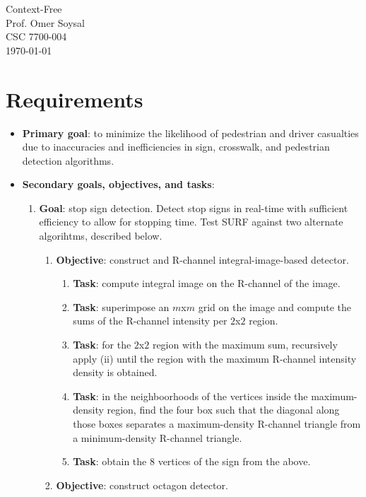 \documentclass{article}
\begin{document}
\begin{flushright}
   Context-Free
\\ Prof. Omer Soysal
\\ CSC 7700-004
\\ \today 
\end{flushright}

\section{Requirements}
\begin{itemize}
 \item \textbf{Primary goal}: to minimize the likelihood of pedestrian and driver casualties due to inaccuracies and inefficiencies in sign, crosswalk, and pedestrian detection algorithms.
 \item \textbf{Secondary goals, objectives, and tasks}: 
  \begin{enumerate} 
    \item \textbf{Goal}: stop sign detection. Detect stop signs in real-time with sufficient efficiency to allow for stopping time. Test SURF against two alternate algorihtms, described below.
    \begin{enumerate} 
     \item \textbf{Objective}: construct and R-channel integral-image-based detector.
      \begin{enumerate}
       \item \textbf{Task}: compute integral image on the R-channel of the image. 
       \item \textbf{Task}: superimpose an $m$x$m$ grid on the image and compute the
                   sums of the R-channel intensity per $2$x$2$ region.
       \item \textbf{Task}: for the $2$x$2$ region with the maximum sum, recursively
                   apply (ii) until the region with the maximum R-channel
                   intensity density  is obtained.
       \item \textbf{Task}: in the neighboorhoods of the vertices inside the
                   maximum-density region, find the four box such that the
                   diagonal along those boxes separates a maximum-density
                   R-channel triangle from a minimum-density R-channel
                   triangle.
       \item \textbf{Task}: obtain the 8 vertices of the sign from the above.
      \end{enumerate} 
     \item \textbf{Objective}: construct octagon detector.

\end{enumerate}
\end{enumerate}
\end{itemize}
\end{document}
